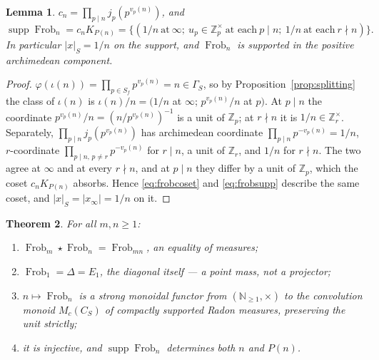 \documentclass[11pt]{amsart}
\newtheorem{theorem}{Theorem}[section]
\newtheorem{lemma}[theorem]{Lemma}
\theoremstyle{definition}
\theoremstyle{remark}
\newcommand{\N}{\mathbb N}
\newcommand{\Z}{\mathbb Z}
\newcommand{\Frob}{\operatorname{Frob}}
\newcommand{\supp}{\operatorname{supp}}
\begin{document}
\begin{lemma}\label{lem:frobsupport}
$c_n=\prod_{p\mid n}j_p(p^{v_p(n)})$, and
\begin{equation}\label{eq:frobsupp}
  \supp\Frob_n=c_nK_{P(n)}
  =\bigl\{(1/n\ \text{at}\ \infty;\ u_p\in\Z_p^\times\ \text{at each}\ p\mid n;
    \ 1/n\ \text{at each}\ r\nmid n)\bigr\}.
\end{equation}
In particular $|x|_S=1/n$ on the support, and $\Frob_n$ is supported in the
positive archimedean component.
\end{lemma}

\begin{proof}
$\varphi(\iota(n))=\prod_{p\in S_f}p^{v_p(n)}=n\in\Gamma_S$, so by
Proposition~\ref{prop:splitting} the class of $\iota(n)$ is
$\iota(n)/n=(1/n$ at $\infty$; $p^{v_p(n)}/n$ at $p)$. At $p\mid n$ the
coordinate $p^{v_p(n)}/n=(n/p^{v_p(n)})^{-1}$ is a unit of $\Z_p$; at $r\nmid
n$ it is $1/n\in\Z_r^\times$. Separately,
$\prod_{p\mid n}j_p(p^{v_p(n)})$ has archimedean coordinate
$\prod_{p\mid n}p^{-v_p(n)}=1/n$, $r$-coordinate
$\prod_{p\mid n,\,p\ne r}p^{-v_p(n)}$ for $r\mid n$, a unit of $\Z_r$, and
$1/n$ for $r\nmid n$. The two agree at $\infty$ and at every $r\nmid n$, and at
$p\mid n$ they differ by a unit of $\Z_p$, which the coset $c_nK_{P(n)}$
absorbs. Hence \eqref{eq:frobcoset} and \eqref{eq:frobsupp} describe the same
coset, and $|x|_S=|x_\infty|=1/n$ on it.
\end{proof}

\begin{theorem}\label{thm:frobmonoidal}
For all $m,n\ge1$:
\begin{enumerate}
\item[(i)] $\Frob_m\star\Frob_n=\Frob_{mn}$, an \emph{equality} of measures;
\item[(ii)] $\Frob_1=\Delta=E_1$, the diagonal itself --- a point mass, not a
projector;
\item[(iii)] $n\mapsto\Frob_n$ is a strong monoidal functor from
$(\N_{\ge1},\times)$ to the convolution monoid $M_c(C_S)$ of compactly
supported Radon measures, preserving the unit strictly;
\item[(iv)] it is injective, and $\supp\Frob_n$ determines both $n$ and
$P(n)$.
\end{enumerate}
\end{theorem}
\end{document}
